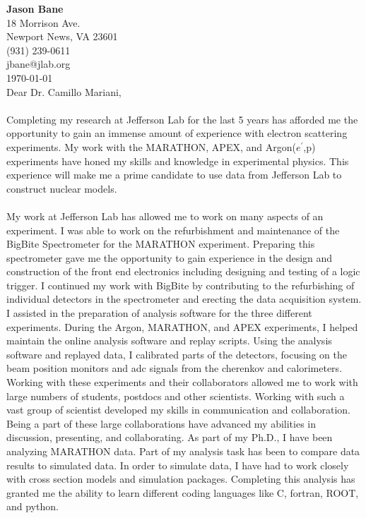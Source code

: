 \documentclass[12pt,letterpaper]{article}
\newcommand{\CPP}
{C\nolinebreak[4]\hspace{-.05em}\raisebox{.22ex}{\footnotesize\bf ++}}
\begin{document}
{\textbf{Jason Bane}}\\
18 Morrison Ave. \\
Newport News, VA 23601 \\
(931) 239-0611 \\
jbane@jlab.org \\
\today\\

Dear Dr. Camillo Mariani, 

\paragraph{}Completing my research at Jefferson Lab for the last 5 years has afforded me the opportunity to gain an immense amount of experience with electron scattering experiments. My work with the MARATHON, APEX, and Argon($e^\prime$,p) experiments have honed my skills and knowledge in experimental physics. This experience will make me a prime candidate to use data from Jefferson Lab to construct nuclear models. 
\paragraph{}My work at Jefferson Lab has allowed me to work on many aspects of an experiment. I was able to work on the refurbishment and maintenance of the BigBite Spectrometer for the MARATHON experiment. Preparing this spectrometer gave me the opportunity to gain experience in the design and construction of the front end electronics including designing and testing of a logic trigger. I continued my work with BigBite by contributing to the refurbishing of individual detectors in the spectrometer and erecting the data acquisition system. I assisted in the preparation of analysis software for the three different experiments. During the Argon, MARATHON, and APEX experiments, I helped maintain the online analysis software and replay scripts. Using the analysis software and replayed data, I calibrated parts of the detectors, focusing on the beam position monitors and adc signals from the cherenkov and calorimeters. Working with these experiments and their collaborators allowed me to work with large numbers of students, postdocs and other scientists.  Working with such a vast group of scientist developed my skills in communication and collaboration. Being a part of these large collaborations have advanced my abilities in discussion, presenting, and collaborating.
As part of my Ph.D., I have been analyzing MARATHON data. Part of my analysis task has been to compare data results to simulated data. In order to simulate data, I have had to work closely with cross section models and simulation packages. Completing this analysis has granted me the ability to learn different coding languages like \CPP, fortran, ROOT, and python.
\end{document}
